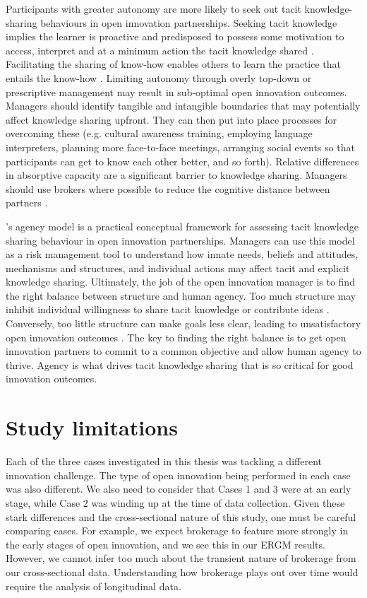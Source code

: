 Participants with greater autonomy are more likely to seek out tacit knowledge-sharing behaviours in open innovation partnerships. Seeking tacit knowledge implies the learner is proactive and predisposed to possess some motivation to access, interpret and at a minimum action the tacit knowledge shared \citep{gubbins2021delineating}. Facilitating the sharing of know-how enables others to learn the practice that entails the know-how \citep{cook1999bridging}. Limiting autonomy through overly top-down or prescriptive management may result in sub-optimal open innovation outcomes. Managers should identify tangible and intangible boundaries that may potentially affect knowledge sharing upfront. They can then put into place processes for overcoming these (e.g. cultural awareness training, employing language interpreters, planning more face-to-face meetings, arranging social events so that participants can get to know each other better, and so forth). Relative differences in absorptive capacity are a significant barrier to knowledge sharing. Managers should use brokers where possible to reduce the cognitive distance between partners \citep{kokshagina2017fast}. \medskip

\citeauthor{loyal2001agency}'s \citeyearpar{loyal2001agency} agency model is a practical conceptual framework for assessing tacit knowledge sharing behaviour in open innovation partnerships. Managers can use this model as a risk management tool to understand how innate needs, beliefs and attitudes, mechanisms and structures, and individual actions may affect tacit and explicit knowledge sharing. Ultimately, the job of the open innovation manager is to find the right balance between structure and human agency. Too much structure may inhibit individual willingness to share tacit knowledge or contribute ideas \citep{al2021understanding}. Conversely, too little structure can make goals less clear, leading to unsatisfactory open innovation outcomes \citep{nunes2020managing}. The key to finding the right balance is to get open innovation partners to commit to a common objective and allow human agency to thrive. Agency is what drives tacit knowledge sharing that is so critical for good innovation outcomes.


 \section{Study limitations}
 
 Each of the three cases investigated in this thesis was tackling a different innovation challenge. The type of open innovation being performed in each case was also different. We also need to consider that Cases 1 and 3 were at an early stage, while Case 2 was winding up at the time of data collection. Given these stark differences and the cross-sectional nature of this study, one must be careful comparing cases. For example, we expect brokerage to feature more strongly in the early stages of open innovation, and we see this in our ERGM results. However, we cannot infer too much about the transient nature of brokerage from our cross-sectional data. Understanding how brokerage plays out over time would require the analysis of longitudinal data. \medskip

